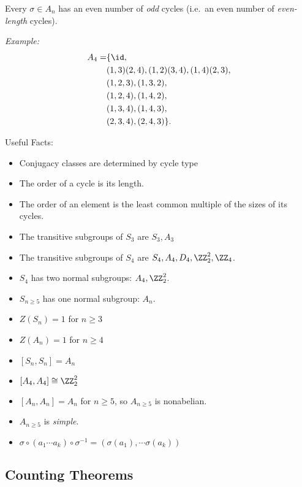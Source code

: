 \begin{corollary}

Every \(\sigma \in A_n\) has an even number of \emph{odd} cycles
(i.e.~an even number of \emph{even-length} cycles).

\end{corollary}

\emph{Example:} \begin{align*}
A_4 =
&\{\id, \\
&(1,3)(2,4),
(1,2)(3,4),
(1,4)(2,3), \\
& (1,2,3),
(1,3,2), \\
& (1,2,4),
(1,4,2), \\
& (1,3,4),
(1,4,3), \\
& (2,3,4),
(2,4,3)\}
.\end{align*}

Useful Facts:

\begin{itemize}
\tightlist
\item
  Conjugacy classes are determined by cycle type
\item
  The order of a cycle is its length.
\item
  The order of an element is the least common multiple of the sizes of
  its cycles.
\item
  The transitive subgroups of \(S_3\) are \(S_3, A_3\)
\item
  The transitive subgroups of \(S_4\) are
  \(S_4, A_4, D_4, \ZZ_2^2, \ZZ_4\).
\item
  \(S_4\) has two normal subgroups: \(A_4, \ZZ_2^2\).
\item
  \(S_{n\geq 5}\) has one normal subgroup: \(A_n\).
\item
  \(Z(S_n) = 1\) for \(n\geq 3\)
\item
  \(Z(A_n) = 1\) for \(n\geq 4\)
\item
  \([S_n, S_n] = A_n\)
\item
  \([A_4, A_4] \cong \ZZ_2^2\)
\item
  \([A_n, A_n] = A_n\) for \(n\geq 5\), so \(A_{n\geq 5}\) is
  nonabelian.
\item
  \(A_{n\geq 5}\) is \emph{simple}.
\item
  \(\sigma \circ (a_1 \cdots a_k)\circ \sigma^{-1} = (\sigma(a_1), \cdots \sigma(a_k))\)
\end{itemize}

\hypertarget{counting-theorems}{%
\subsection{Counting Theorems}\label{counting-theorems}}

